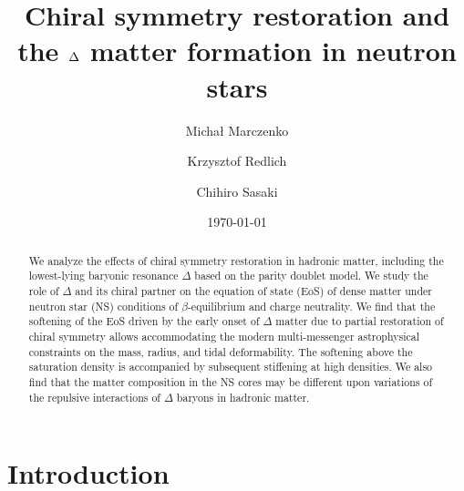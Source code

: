 \documentclass[preprint,showkeys,lengthcheck,nofootinbib,twocolumn,notitlepage,floatfix,superscriptaddress]{revtex4-1}
\begin{document}
\title{Chiral symmetry restoration and the \texorpdfstring{$\ensuremath \Delta$}{} matter formation in neutron stars}

\date{\today}
\author{Micha\l{} Marczenko}
\address{Incubator of Scientific Excellence - Centre for Simulations of Superdense Fluids, University of Wroc\l{}aw, plac Maksa Borna 9, PL-50204 Wroc\l{}aw, Poland}
%
\author{Krzysztof Redlich}
\address{Institute of Theoretical Physics, University of Wroc\l{}aw, plac Maksa Borna 9, PL-50204 Wroc\l{}aw, Poland}
%
\author{Chihiro Sasaki}
\address{Institute of Theoretical Physics, University of Wroc\l{}aw, plac Maksa Borna 9, PL-50204 Wroc\l{}aw, Poland}

\begin{abstract}
	We analyze the effects of chiral symmetry restoration in hadronic matter, including the lowest-lying baryonic resonance $\Delta$ based on the parity doublet model. We study the role of $\Delta$ and its chiral partner on the equation of state (EoS) of dense matter under neutron star (NS) conditions of $\beta$-equilibrium and charge neutrality. We find that the softening of the EoS driven by the early onset of $\Delta$ matter due to partial restoration of chiral symmetry allows accommodating the modern multi-messenger astrophysical constraints on the mass, radius, and tidal deformability. The softening above the saturation density is accompanied by subsequent stiffening at high densities. We also find that the matter composition in the NS cores may be different upon variations of the repulsive interactions of $\Delta$ baryons in hadronic matter.
\end{abstract}
\pacs{}
\maketitle %

\section{Introduction}
\label{sec:introduction}
\end{document}
